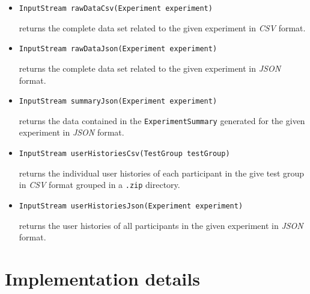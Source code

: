 \documentclass[a4paper]{usiinfbachelorproject}
\begin{document}
\begin{description}
        \begin{itemize}

            \item \texttt{InputStream rawDataCsv(Experiment experiment)} 

                    returns the complete data set related to the given experiment in \emph{CSV} format.

            \item \texttt{InputStream rawDataJson(Experiment experiment)}

                    returns the complete data set related to the given experiment in \emph{JSON} format.

            \item \texttt{InputStream summaryJson(Experiment experiment)}

                    returns the data contained in the \texttt{ExperimentSummary} generated for the given experiment in \emph{JSON} format.

            \item \texttt{InputStream userHistoriesCsv(TestGroup testGroup)}

                    returns the individual user histories of each participant in the give test group in \emph{CSV} format 
                    grouped in a \texttt{.zip} directory.

            \item \texttt{InputStream userHistoriesJson(Experiment experiment)}

                    returns the user histories of all participants in the given experiment in \emph{JSON} format.

        \end{itemize}

\end{description}




\section{\textbf{Implementation details}} \label{sec:impl}

\end{document}
